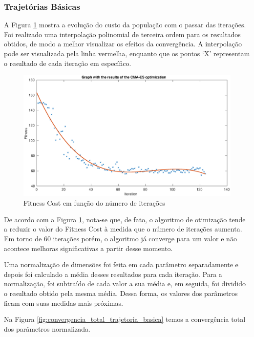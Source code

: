 \documentclass[a4paper,12pt]{article}
\begin{document}
\subsubsection{Trajetórias Básicas}

A Figura \ref{fig:fitness_trajetoria_basica} mostra a evolução do custo da população com o passar das iterações. Foi realizado uma interpolação polinomial de terceira ordem para os resultados obtidos, de modo a melhor visualizar os efeitos da convergência. A interpolação pode ser visualizada pela linha vermelha, enquanto que os pontos `X’ representam o resultado de cada iteração em específico.

\begin{figure}[H]
	\centering
	\includegraphics[width=1.0\textwidth]{figures/CMA-ES_Fitness_Results.eps}
	\caption{Fitness Cost em função do número de iterações}
	\label{fig:fitness_trajetoria_basica}
\end{figure}

De acordo com a Figura \ref{fig:fitness_trajetoria_basica}, nota-se que, de fato, o algoritmo de otimização tende a reduzir o valor do Fitness Cost à medida que o número de iterações aumenta. Em torno de 60 iterações porém, o algoritmo já converge para um valor e não acontece melhoras significativas a partir desse momento.

Uma normalização de dimensões foi feita em cada parâmetro separadamente e depois foi calculado a média desses resultados para cada iteração. Para a normalização, foi subtraído de cada valor a sua média e, em seguida, foi dividido o resultado obtido pela mesma média. Dessa forma, os valores dos parâmetros ficam com suas medidas mais próximas.

Na Figura \ref{fig:convergencia_total_trajetoria_basica} temos a convergência total dos parâmetros normalizada. 
\end{document}
